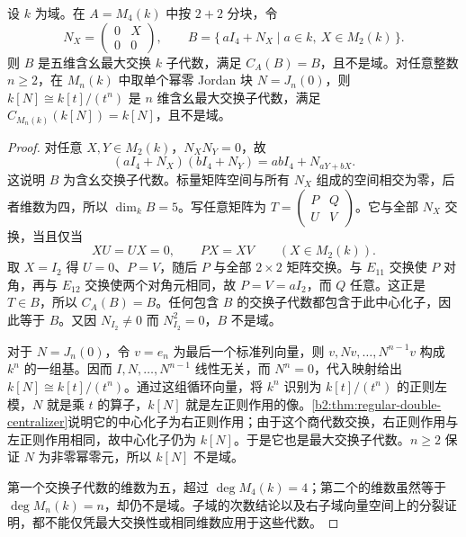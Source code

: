 \begin{proposition}\label{b2:prop:maximal-commutative-not-field}
	设 \(k\) 为域。在 \(A=M_4(k)\) 中按 \(2+2\) 分块，令
	\[
		N_X=\begin{pmatrix}0&X\\0&0\end{pmatrix},\qquad
		B=\{\,aI_4+N_X\mid a\in k,\ X\in M_2(k)\,\}.
	\]
	则 \(B\) 是五维含幺最大交换 \(k\) 子代数，满足 \(C_A(B)=B\)，且不是域。对任意整数 \(n\ge2\)，在 \(M_n(k)\) 中取单个幂零 Jordan 块 \(N=J_n(0)\)，则 \(k[N]\cong k[t]/(t^n)\) 是 \(n\) 维含幺最大交换子代数，满足 \(C_{M_n(k)}(k[N])=k[N]\)，且不是域。
\end{proposition}
\begin{proof}
	对任意 \(X,Y\in M_2(k)\)，\(N_XN_Y=0\)，故
	\[
		(aI_4+N_X)(bI_4+N_Y)=abI_4+N_{aY+bX}.
	\]
	这说明 \(B\) 为含幺交换子代数。标量矩阵空间与所有 \(N_X\) 组成的空间相交为零，后者维数为四，所以 \(\dim_kB=5\)。写任意矩阵为 \(T=\begin{pmatrix}P&Q\\U&V\end{pmatrix}\)。它与全部 \(N_X\) 交换，当且仅当
	\[
		XU=UX=0,\qquad PX=XV\qquad(X\in M_2(k)).
	\]
	取 \(X=I_2\) 得 \(U=0\)、\(P=V\)，随后 \(P\) 与全部 \(2\times2\) 矩阵交换。与 \(E_{11}\) 交换使 \(P\) 对角，再与 \(E_{12}\) 交换使两个对角元相同，故 \(P=V=aI_2\)，而 \(Q\) 任意。这正是 \(T\in B\)，所以 \(C_A(B)=B\)。任何包含 \(B\) 的交换子代数都包含于此中心化子，因此等于 \(B\)。又因 \(N_{I_2}\ne0\) 而 \(N_{I_2}^2=0\)，\(B\) 不是域。

	对于 \(N=J_n(0)\)，令 \(v=e_n\) 为最后一个标准列向量，则 \(v,Nv,\ldots,N^{n-1}v\) 构成 \(k^n\) 的一组基。因而 \(I,N,\ldots,N^{n-1}\) 线性无关，而 \(N^n=0\)，代入映射给出 \(k[N]\cong k[t]/(t^n)\)。通过这组循环向量，将 \(k^n\) 识别为 \(k[t]/(t^n)\) 的正则左模，\(N\) 就是乘 \(t\) 的算子，\(k[N]\) 就是左正则作用的像。\cref{b2:thm:regular-double-centralizer}说明它的中心化子为右正则作用；由于这个商代数交换，右正则作用与左正则作用相同，故中心化子仍为 \(k[N]\)。于是它也是最大交换子代数。\(n\ge2\) 保证 \(N\) 为非零幂零元，所以 \(k[N]\) 不是域。

	第一个交换子代数的维数为五，超过 \(\deg M_4(k)=4\)；第二个的维数虽然等于 \(\deg M_n(k)=n\)，却仍不是域。子域的次数结论以及右子域向量空间上的分裂证明，都不能仅凭最大交换性或相同维数应用于这些代数。
\end{proof}
